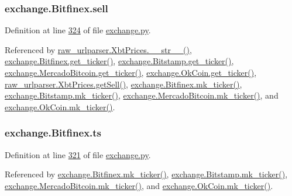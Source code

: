 \subsubsection[{\texorpdfstring{sell}{sell}}]{\setlength{\rightskip}{0pt plus 5cm}exchange.\+Bitfinex.\+sell}\hypertarget{classexchange_1_1_bitfinex_a9aebaf447f73e582f7bc626e526e0201}{}\label{classexchange_1_1_bitfinex_a9aebaf447f73e582f7bc626e526e0201}


Definition at line \hyperlink{exchange_8py_source_l00324}{324} of file \hyperlink{exchange_8py_source}{exchange.\+py}.



Referenced by \hyperlink{raw__urlparser_8py_source_l00074}{raw\+\_\+urlparser.\+Xbt\+Prices.\+\_\+\+\_\+str\+\_\+\+\_\+()}, \hyperlink{exchange_8py_source_l00332}{exchange.\+Bitfinex.\+get\+\_\+ticker()}, \hyperlink{exchange_8py_source_l00401}{exchange.\+Bitstamp.\+get\+\_\+ticker()}, \hyperlink{exchange_8py_source_l00535}{exchange.\+Mercado\+Bitcoin.\+get\+\_\+ticker()}, \hyperlink{exchange_8py_source_l00600}{exchange.\+Ok\+Coin.\+get\+\_\+ticker()}, \hyperlink{raw__urlparser_8py_source_l00065}{raw\+\_\+urlparser.\+Xbt\+Prices.\+get\+Sell()}, \hyperlink{exchange_8py_source_l00346}{exchange.\+Bitfinex.\+mk\+\_\+ticker()}, \hyperlink{exchange_8py_source_l00415}{exchange.\+Bitstamp.\+mk\+\_\+ticker()}, \hyperlink{exchange_8py_source_l00549}{exchange.\+Mercado\+Bitcoin.\+mk\+\_\+ticker()}, and \hyperlink{exchange_8py_source_l00614}{exchange.\+Ok\+Coin.\+mk\+\_\+ticker()}.

\subsubsection[{\texorpdfstring{ts}{ts}}]{\setlength{\rightskip}{0pt plus 5cm}exchange.\+Bitfinex.\+ts}\hypertarget{classexchange_1_1_bitfinex_abf872e8ea738acd33d34a00d9d9e92c4}{}\label{classexchange_1_1_bitfinex_abf872e8ea738acd33d34a00d9d9e92c4}


Definition at line \hyperlink{exchange_8py_source_l00321}{321} of file \hyperlink{exchange_8py_source}{exchange.\+py}.



Referenced by \hyperlink{exchange_8py_source_l00346}{exchange.\+Bitfinex.\+mk\+\_\+ticker()}, \hyperlink{exchange_8py_source_l00415}{exchange.\+Bitstamp.\+mk\+\_\+ticker()}, \hyperlink{exchange_8py_source_l00549}{exchange.\+Mercado\+Bitcoin.\+mk\+\_\+ticker()}, and \hyperlink{exchange_8py_source_l00614}{exchange.\+Ok\+Coin.\+mk\+\_\+ticker()}.

